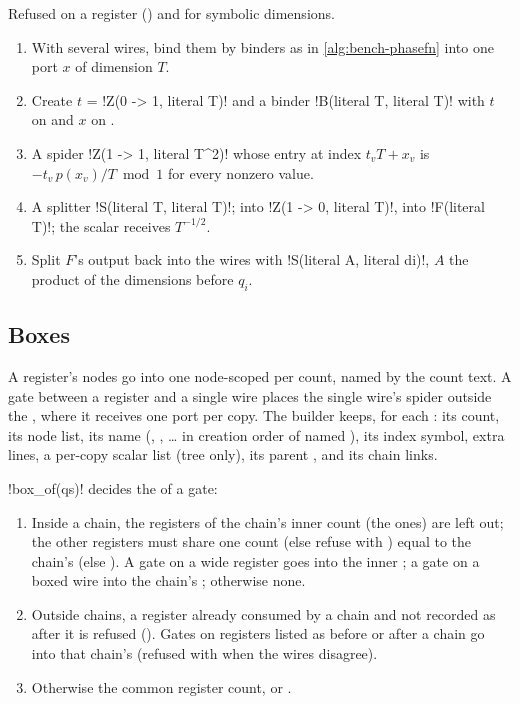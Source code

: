 \begin{algorithm}\label{alg:bench-perm}
Refused on a register () and for symbolic dimensions.
\begin{enumerate}
\item With several wires, bind them by binders as in \cref{alg:bench-phasefn} into one port $x$
  of dimension $T$.
\item Create $t$ = \azx!Z(0 -> 1, literal T)! and a binder \azx!B(literal T, literal T)! with $t$
  on  and $x$ on .
\item A spider \azx!Z(1 -> 1, literal T^2)! whose entry at index $t_vT + x_v$ is
  $-t_v\,p(x_v)/T \bmod 1$ for every nonzero value.
\item A splitter \azx!S(literal T, literal T)!;  into \azx!Z(1 -> 0, literal T)!,
   into \azx!F(literal T)!; the scalar receives $T^{-1/2}$.
\item Split $F$'s output back into the wires with \azx!S(literal A, literal di)!, $A$ the
  product of the dimensions before $q_i$.
\end{enumerate}
\end{algorithm}

\subsection{Boxes}\label{sec:bench-boxes}

A register's nodes go into one node-scoped \bbox{} per count, named by the count text. A gate
between a register and a single wire places the single wire's spider outside the \bbox{}, where
it receives one port per copy. The builder keeps, for each \bbox{}: its count, its node list,
its name (, , \dots{} in creation order of named \bboxes), its index symbol,
extra lines, a per-copy scalar list (tree \bboxes{} only), its parent \bbox, and its chain links.

\py!box_of(qs)! decides the \bbox{} of a gate:
\begin{enumerate}
\item Inside a chain, the registers of the chain's inner count (the  ones) are left
  out; the other registers must share one count (else refuse with ) equal to the chain's (else ). A gate on a wide register goes into the inner \bbox; a gate on a boxed wire
  into the chain's \bbox; otherwise none.
\item Outside chains, a register already consumed by a chain and not recorded as after it is
  refused (). Gates on registers listed as
  before or after a chain go into that chain's \bbox{} (refused with  when the wires disagree).
\item Otherwise the common register count, or .
\end{enumerate}

